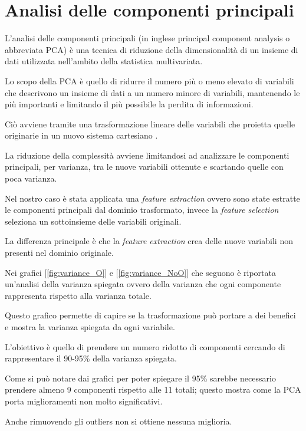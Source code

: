 \section{Analisi delle componenti principali}
L'analisi delle componenti principali (in inglese principal component analysis o abbreviata PCA) è una tecnica di riduzione della dimensionalità di un insieme di dati utilizzata nell'ambito della statistica multivariata.

\noindent
Lo scopo della PCA è quello di ridurre il numero più o meno elevato di variabili che descrivono un insieme di dati a un numero minore di variabili, mantenendo le più importanti e limitando il più possibile la perdita di informazioni.

\noindent
Ciò avviene tramite una trasformazione lineare delle variabili che proietta quelle originarie in un nuovo sistema cartesiano \cite{PCA_wikipedia}.

\noindent
La riduzione della complessità avviene limitandosi ad analizzare le componenti principali, per varianza, tra le nuove variabili ottenute e scartando quelle con poca varianza.

\noindent
Nel nostro caso è stata applicata una \textit{feature extraction} ovvero sono state estratte le componenti principali dal dominio trasformato, invece la \textit{feature selection} seleziona un sottoinsieme delle variabili originali.

\noindent
La differenza principale è che la \textit{feature extraction} crea delle nuove variabili non presenti nel dominio originale.

\noindent
Nei grafici [\ref{fig:variance_O}] e [\ref{fig:variance_NoO}] che seguono è riportata un'analisi della varianza spiegata ovvero della varianza che ogni componente rappresenta rispetto alla varianza totale.

\noindent
Questo grafico permette di capire se la trasformazione può portare a dei benefici e mostra la varianza spiegata da ogni variabile.

\noindent
L'obiettivo è quello di prendere un numero ridotto di componenti cercando di rappresentare il 90-95\% della varianza spiegata.

\noindent
Come si può notare dai grafici per poter spiegare il 95\% sarebbe necessario prendere almeno 9 componenti rispetto alle 11 totali; questo mostra come la PCA porta miglioramenti non molto significativi.

\noindent
Anche rimuovendo gli outliers non si ottiene nessuna miglioria.

